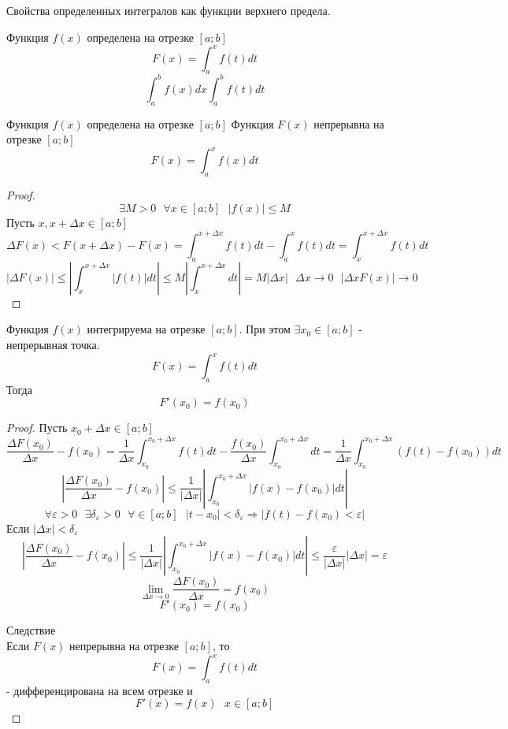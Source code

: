 \begin{title}
  Свойства определенных интегралов как функции верхнего предела.
\end{title}

Функция $f(x)$ определена на отрезке $[a; b]$
\[F(x) = \int^x_a f(t)dt\]
\[\int^b_a f(x)dx \int^b_a f(t)dt\]

\begin{theorem}[1]
  Функция $f(x)$ определена на отрезке $[a; b]$
  Функция $F(x)$ непрерывна на отрезке $[a; b]$
  \[F(x) = \int^x_a f(x)dt\]
\end{theorem}

\begin{proof}
  \[\exists M > 0 ~~~ \forall x \in [a; b] ~~~ |f(x)| \le M\]
  Пусть $x, x + \Delta x \in [a; b]$
  \[\Delta F(x) < F(x + \Delta x) - F(x) = \int^{x + \Delta x}_a f(t)dt -
    \int^x_a f(t)dt = \int^{x + \Delta x}_x f(t)dt\]
  \[|\Delta F(x)| \le \left |\int^{x + \Delta x}_x |f(t)|dt \right| \le
    M \left |\int^{x + \Delta x}_x dt \right| = M |\Delta x|
    ~~~ \Delta x \to 0 ~~~ |\Delta x F(x)| \to 0\]
\end{proof}

\begin{theorem}[2]
  Функция $f(x)$ интегрируема на отрезке $[a; b]$. При этом
  $\exists x_0 \in [a; b]$ - непрерывная точка.
  \[F(x) = \int^x_a f(t)dt\]
  Тогда
  \[F'(x_0) = f(x_0)\]
\end{theorem}

\begin{proof}
  Пусть $x_0 + \Delta x \in [a; b]$
  \[\frac{\Delta F(x_0)}{\Delta x} - f(x_0) = \frac{1}{\Delta x}
    \int^{x_0 + \Delta x}_{x_0} f(t)dt - \frac{f(x_0)}{\Delta x}
    \int^{x_0 + \Delta x}_{x_0} dt = \frac{1}{\Delta x}
    \int^{x_0 + \Delta x}_{x_0} (f(t) - f(x_0))dt\]
  \[\left | \frac{\Delta F(x_0)}{\Delta x} - f(x_0)
    \right | \le \frac{1}{|\Delta x|} \left |
    \int^{x_0 + \Delta x}_{x_0} |f(x) - f(x_0)|dt \right |\]
  \[\forall \varepsilon > 0 ~~~ \exists \delta_\varepsilon > 0
    ~~~ \forall \in [a; b] ~~~ |t - x_0| < \delta_\varepsilon \Rightarrow
    |f(t) - f(x_0) < \varepsilon|\]
  Если $|\Delta x| < \delta_\varepsilon$
  \[\left | \frac{\Delta F(x_0)}{\Delta x} - f(x_0) \right | \le
    \frac{1}{|\Delta x|} \left | \int^{x_0 + \Delta x}_{x_0} |f(x) -
    f(x_0)|dt \right | \le \frac{\varepsilon}{|\Delta x|} |\Delta x| =
    \varepsilon\]
  \[\lim_{\Delta x \to 0} \frac{\Delta F(x_0)}{\Delta x} = f(x_0)\]
  \[F'(x_0) = f(x_0)\]

  Следствие\\
  Если $F(x)$ непрерывна на отрезке $[a; b]$, то
  \[F(x) = \int^x_a f(t)dt\] - дифференцирована на всем отрезке и
  \[F'(x) = f(x) ~~~ x \in [a; b]\]
\end{proof}

